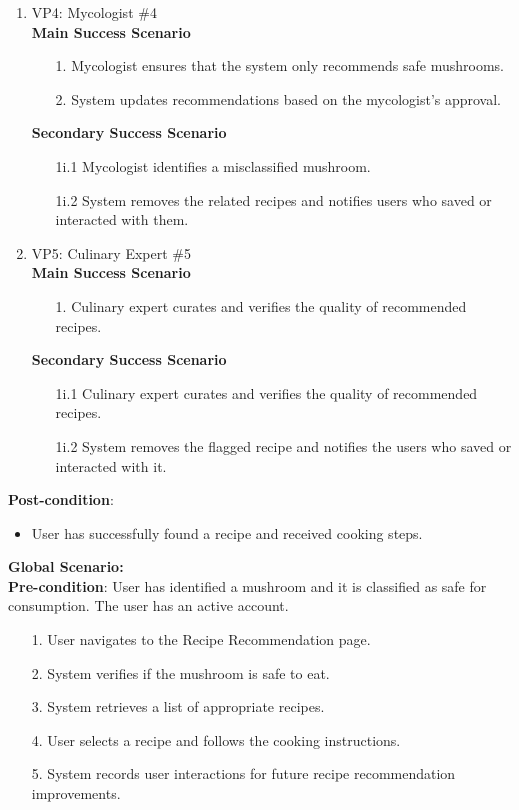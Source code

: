 \documentclass{article}
\begin{document}
\begin{enumerate}[{\bf BE1.}]
\begin{enumerate}[{\bf VP1.}]
			\item VP4: Mycologist \#4 \\
				\textbf{Main Success Scenario} 
			\begin{enumerate}
				\item[1.] Mycologist ensures that the system only recommends safe mushrooms.
					\item[2.] System updates recommendations based on the mycologist's approval.
			\end{enumerate}
				\textbf{Secondary Success Scenario}
				\begin{enumerate}
				\item[1i.1] Mycologist identifies a misclassified mushroom.
					\item[1i.2] System removes the related recipes and notifies users who saved or interacted with them.
				\end{enumerate}
			
			\item VP5: Culinary Expert \#5 \\
				\textbf{Main Success Scenario} 
			\begin{enumerate}
				\item[1.] Culinary expert curates and verifies the quality of recommended recipes.
			\end{enumerate}
				\textbf{Secondary Success Scenario} 
			\begin{enumerate}
				\item[1i.1] Culinary expert curates and verifies the quality of recommended recipes.
					\item[1i.2] System removes the flagged recipe and notifies the users who saved or interacted with it.
			\end{enumerate}                    
		\end{enumerate}
			
			\textbf{Post-condition}:  
			\begin{itemize}
				\item User has successfully found a recipe and received cooking steps.
			\end{itemize}
			
			\textbf{Global Scenario:} \\
				\textbf{Pre-condition}: User has identified a mushroom and it is classified as safe for consumption. The user has an active account.
			\begin{enumerate}
				\item[1.] User navigates to the Recipe Recommendation page.
				\item[2.] System verifies if the mushroom is safe to eat.
				\item[3.] System retrieves a list of appropriate recipes.
				\item[4.] User selects a recipe and follows the cooking instructions.
				\item[5.] System records user interactions for future recipe recommendation improvements.
			\end{enumerate}


\end{enumerate}
\end{document}
